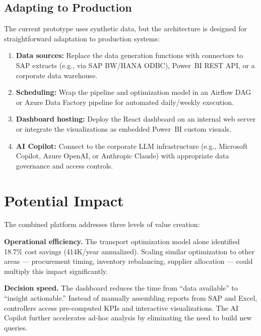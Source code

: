 \documentclass[11pt,a4paper]{article}
\begin{document}
\subsection{Adapting to Production}

The current prototype uses synthetic data, but the architecture is designed for straightforward adaptation to production systems:

\begin{enumerate}[leftmargin=2em]
    \item \textbf{Data sources:} Replace the data generation functions with connectors to SAP extracts (e.g., via SAP BW/HANA ODBC), Power~BI REST API, or a corporate data warehouse.
    \item \textbf{Scheduling:} Wrap the pipeline and optimization model in an Airflow DAG or Azure Data Factory pipeline for automated daily/weekly execution.
    \item \textbf{Dashboard hosting:} Deploy the React dashboard on an internal web server or integrate the visualizations as embedded Power~BI custom visuals.
    \item \textbf{AI Copilot:} Connect to the corporate LLM infrastructure (e.g., Microsoft Copilot, Azure OpenAI, or Anthropic Claude) with appropriate data governance and access controls.
\end{enumerate}


\section{Potential Impact}

The combined platform addresses three levels of value creation:

\textbf{Operational efficiency.} The transport optimization model alone identified 18.7\% cost savings (\texttildelow\texteuro 414K/year annualized). Scaling similar optimization to other areas --- procurement timing, inventory rebalancing, supplier allocation --- could multiply this impact significantly.

\textbf{Decision speed.} The dashboard reduces the time from ``data available'' to ``insight actionable.'' Instead of manually assembling reports from SAP and Excel, controllers access pre-computed KPIs and interactive visualizations. The AI Copilot further accelerates ad-hoc analysis by eliminating the need to build new queries.
\end{document}
